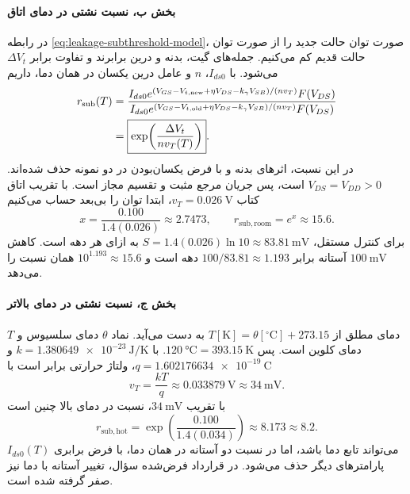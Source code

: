 \paragraph*{بخش ب، نسبت نشتی در دمای اتاق}
در رابطه \eqref{eq:leakage-subthreshold-model}، صورت توان حالت
جدید را از صورت توان حالت قدیم کم می‌کنیم. جمله‌های گیت، بدنه و
درین برابرند و تفاوت برابر \(\Delta V_t\) می‌شود.
با \(I_{ds0}\)، \(n\) و عامل درین یکسان در همان دما، داریم
\begin{align}
 r_{\mathrm{sub}}(T)
 &=\frac{I_{ds0}e^{(V_{GS}-V_{t,\mathrm{new}}+\eta V_{DS}-k_\gamma V_{SB})/(nv_T)}F(V_{DS})}
 {I_{ds0}e^{(V_{GS}-V_{t,\mathrm{old}}+\eta V_{DS}-k_\gamma V_{SB})/(nv_T)}F(V_{DS})}
 \notag\\
 &=\boxed{\exp\!\left(\frac{\Delta V_t}{nv_T(T)}\right)}.
 \label{eq:leakage-ex10-ratio-derivation}
\end{align}
در این نسبت، اثرهای بدنه و  با فرض یکسان‌بودن در دو
نمونه حذف شده‌اند. \(V_{DS}=V_{DD}>0\) است، پس جریان مرجع مثبت
و تقسیم مجاز است.
با تقریب اتاق کتاب \(v_T=\qty{0.026}{\volt}\)، ابتدا توان را
بی‌بعد حساب می‌کنیم
\begin{equation*}
 x=\frac{0.100}{1.4(0.026)}\approx2.7473,\qquad
 r_{\mathrm{sub,room}}=e^x\approx\boxed{15.6}.
\end{equation*}
برای کنترل مستقل،
\(S=1.4(0.026)\ln10\approx\qty{83.81}{\milli\volt}\) به ازای
هر دهه است. کاهش \(\qty{100}{\milli\volt}\) آستانه برابر
\(100/83.81\approx1.193\) دهه است و
\(10^{1.193}\approx15.6\) همان نسبت را می‌دهد.

\paragraph*{بخش ج، نسبت نشتی در دمای بالاتر}
دمای مطلق از \(T[\mathrm{K}]=\theta[{}^\circ\mathrm{C}]+273.15\)
به دست می‌آید. نماد \(\theta\) دمای سلسیوس و \(T\) دمای کلوین
است. پس \(\qty{120}{\degreeCelsius}=\qty{393.15}{\kelvin}\).
با \(k=\qty{1.380649e-23}{\joule\per\kelvin}\) و
\(q=\qty{1.602176634e-19}{\coulomb}\)، ولتاژ حرارتی برابر است با
\begin{equation*}
 v_T=\frac{kT}{q}\approx\qty{0.033879}{\volt}
 \approx\qty{34}{\milli\volt}.
\end{equation*}
با تقریب \(\qty{34}{\milli\volt}\)، نسبت در دمای بالا چنین است
\begin{equation*}
 r_{\mathrm{sub,hot}}=
 \exp\!\left(\frac{0.100}{1.4(0.034)}\right)
 \approx8.173\approx\boxed{8.2}.
\end{equation*}
\(I_{ds0}(T)\) می‌تواند تابع دما باشد، اما در نسبت دو آستانه در
همان دما، با فرض برابری پارامترهای دیگر حذف می‌شود.
در قرارداد فرض‌شده سؤال، تغییر آستانه با دما نیز صفر گرفته شده است.

